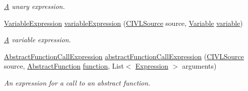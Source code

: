 \begin{DoxyCompactItemize}
\begin{DoxyCompactList}\small\item\em \hyperlink{structA}{A} unary expression. \end{DoxyCompactList}\item 
\hyperlink{interfaceedu_1_1udel_1_1cis_1_1vsl_1_1civl_1_1model_1_1IF_1_1expression_1_1VariableExpression}{Variable\+Expression} \hyperlink{interfaceedu_1_1udel_1_1cis_1_1vsl_1_1civl_1_1model_1_1IF_1_1ModelFactory_a492ed5c7cda003437fec6a17bca76116}{variable\+Expression} (\hyperlink{interfaceedu_1_1udel_1_1cis_1_1vsl_1_1civl_1_1model_1_1IF_1_1CIVLSource}{C\+I\+V\+L\+Source} source, \hyperlink{interfaceedu_1_1udel_1_1cis_1_1vsl_1_1civl_1_1model_1_1IF_1_1variable_1_1Variable}{Variable} \hyperlink{interfaceedu_1_1udel_1_1cis_1_1vsl_1_1civl_1_1model_1_1IF_1_1ModelFactory_a173a1c077dcd3e6f69566bedbc76c51b}{variable})
\begin{DoxyCompactList}\small\item\em \hyperlink{structA}{A} variable expression. \end{DoxyCompactList}\item 
\hyperlink{interfaceedu_1_1udel_1_1cis_1_1vsl_1_1civl_1_1model_1_1IF_1_1expression_1_1AbstractFunctionCallExpression}{Abstract\+Function\+Call\+Expression} \hyperlink{interfaceedu_1_1udel_1_1cis_1_1vsl_1_1civl_1_1model_1_1IF_1_1ModelFactory_a16c1f75c2c4de8edb5c928d2cb6b71f7}{abstract\+Function\+Call\+Expression} (\hyperlink{interfaceedu_1_1udel_1_1cis_1_1vsl_1_1civl_1_1model_1_1IF_1_1CIVLSource}{C\+I\+V\+L\+Source} source, \hyperlink{interfaceedu_1_1udel_1_1cis_1_1vsl_1_1civl_1_1model_1_1IF_1_1AbstractFunction}{Abstract\+Function} \hyperlink{interfaceedu_1_1udel_1_1cis_1_1vsl_1_1civl_1_1model_1_1IF_1_1ModelFactory_af44a1cdc35eba3261ad20baa1063b7c8}{function}, List$<$ \hyperlink{interfaceedu_1_1udel_1_1cis_1_1vsl_1_1civl_1_1model_1_1IF_1_1expression_1_1Expression}{Expression} $>$ arguments)
\begin{DoxyCompactList}\small\item\em An expression for a call to an abstract function. \end{DoxyCompactList}\item 

\end{DoxyCompactItemize}
